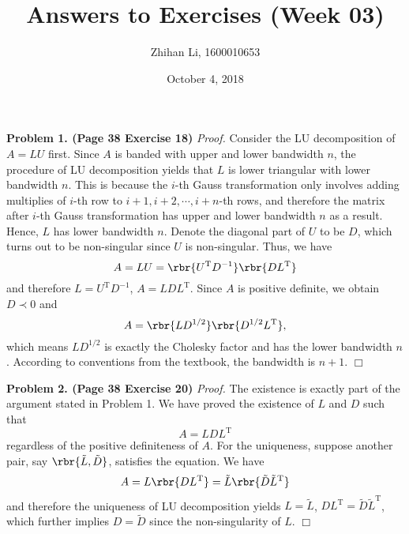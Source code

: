 \documentclass[english, nochinese]{pnote}
\title{Answers to Exercises (Week 03)}
\author{Zhihan Li, 1600010653}
\date{October 4, 2018}
\begin{document}
\maketitle

\textbf{Problem 1. (Page 38 Exercise 18)} \textit{Proof.} Consider the LU decomposition of $ A = L U $ first. Since $A$ is banded with upper and lower bandwidth $n$, the procedure of LU decomposition yields that $L$ is lower triangular with lower bandwidth $n$. This is because the $i$-th Gauss transformation only involves adding multiplies of $i$-th row to $ i + 1, i + 2, \cdots, i + n $-th rows, and therefore the matrix after $i$-th Gauss transformation has upper and lower bandwidth $n$ as a result. Hence, $L$ has lower bandwidth $n$. Denote the diagonal part of $U$ to be $D$, which turns out to be non-singular since $U$ is non-singular. Thus, we have
\begin{equation}
A = L U = \rbr{ U^{\text{T}} D^{-1} } \rbr{ D L^{\text{T}} }
\end{equation}
and therefore $ L = U^{\text{T}} D^{-1} $, $ A = L D L^{\text{T}} $. Since $A$ is positive definite, we obtain $ D \prec 0 $ and
\begin{equation}
A = \rbr{ L D^{ 1 / 2 } } \rbr{ D^{ 1 / 2 } L^{\text{T}} },
\end{equation}
which means $ L D^{ 1 / 2 } $ is exactly the Cholesky factor and has the lower bandwidth $n$. According to conventions from the textbook, the bandwidth is $ n + 1 $.
\hfill$\Box$

\textbf{Problem 2. (Page 38 Exercise 20)} \textit{Proof.} The existence is exactly part of the argument stated in Problem 1. We have proved the existence of $L$ and $D$ such that
\begin{equation}
A = L D L^{\text{T}}
\end{equation}
regardless of the positive definiteness of $A$. For the uniqueness, suppose another pair, say $ \rbr{ \tilde{L}, \tilde{D} } $, satisfies the equation. We have
\begin{equation}
A = L \rbr{ D L^{\text{T}} } = \tilde{L} \rbr{ \tilde{D} \tilde{L}^{\text{T}}}
\end{equation}
and therefore the uniqueness of LU decomposition yields $ L = \tilde{L} $, $ D L^{\text{T}} = \tilde{D} \tilde{L}^{\text{T}} $, which further implies $ D = \tilde{D} $ since the non-singularity of $L$.
\hfill$\Box$
\end{document}
